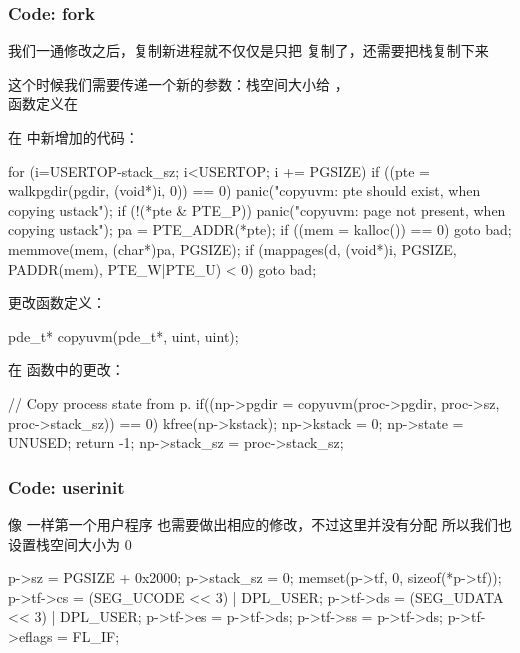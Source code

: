 \subsubsection{Code: fork}

我们一通修改之后，复制新进程就不仅仅是只把  复制了，还需要把栈复制下来

这个时候我们需要传递一个新的参数：栈空间大小给 ，
\\ 函数定义在 

在  中新增加的代码：

\begin{ccode}
    for (i=USERTOP-stack_sz; i<USERTOP; i += PGSIZE) {
        if ((pte = walkpgdir(pgdir, (void*)i, 0)) == 0)
            panic("copyuvm: pte should exist, when copying ustack");
        if (!(*pte & PTE_P))
            panic("copyuvm: page not present, when copying ustack");
        pa = PTE_ADDR(*pte);
        if ((mem = kalloc()) == 0)
            goto bad;
        memmove(mem, (char*)pa, PGSIZE);
        if (mappages(d, (void*)i, PGSIZE, PADDR(mem), PTE_W|PTE_U) < 0)
            goto bad;
    }
\end{ccode}

更改函数定义：

\begin{ccode}
    pde_t*          copyuvm(pde_t*, uint, uint);
\end{ccode}

在  函数中的更改：

\begin{ccode}
    // Copy process state from p.
    if((np->pgdir = copyuvm(proc->pgdir, proc->sz, proc->stack_sz)) == 0){
        kfree(np->kstack);
        np->kstack = 0;
        np->state = UNUSED;
        return -1;
    }
    np->stack_sz = proc->stack_sz;
\end{ccode}

\subsubsection{Code: userinit}

像  一样第一个用户程序  也需要做出相应的修改，不过这里并没有分配  所以我们也设置栈空间大小为 0

\begin{ccode}
    p->sz = PGSIZE + 0x2000;
    p->stack_sz = 0;
    memset(p->tf, 0, sizeof(*p->tf));
    p->tf->cs = (SEG_UCODE << 3) | DPL_USER;
    p->tf->ds = (SEG_UDATA << 3) | DPL_USER;
    p->tf->es = p->tf->ds;
    p->tf->ss = p->tf->ds;
    p->tf->eflags = FL_IF;
\end{ccode}


